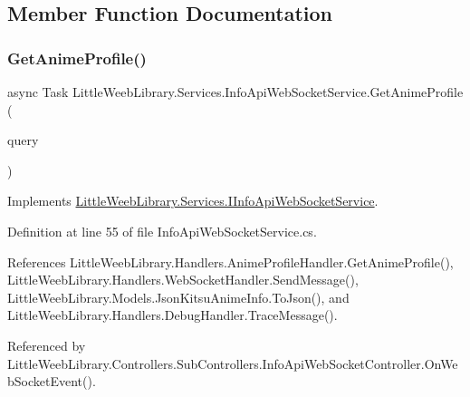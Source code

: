 \subsection{Member Function Documentation}
\mbox{\label{class_little_weeb_library_1_1_services_1_1_info_api_web_socket_service_a12f4d83332b28988ce0e2bc5ff3ed369}} 
\subsubsection{\texorpdfstring{Get\+Anime\+Profile()}{GetAnimeProfile()}}
{\footnotesize\ttfamily async Task Little\+Weeb\+Library.\+Services.\+Info\+Api\+Web\+Socket\+Service.\+Get\+Anime\+Profile (\begin{DoxyParamCaption}\item[{J\+Object}]{query }\end{DoxyParamCaption})}



Implements \mbox{\hyperlink{interface_little_weeb_library_1_1_services_1_1_i_info_api_web_socket_service_a6aef5d33af6000db81bd9467fd88220f}{Little\+Weeb\+Library.\+Services.\+I\+Info\+Api\+Web\+Socket\+Service}}.



Definition at line 55 of file Info\+Api\+Web\+Socket\+Service.\+cs.



References Little\+Weeb\+Library.\+Handlers.\+Anime\+Profile\+Handler.\+Get\+Anime\+Profile(), Little\+Weeb\+Library.\+Handlers.\+Web\+Socket\+Handler.\+Send\+Message(), Little\+Weeb\+Library.\+Models.\+Json\+Kitsu\+Anime\+Info.\+To\+Json(), and Little\+Weeb\+Library.\+Handlers.\+Debug\+Handler.\+Trace\+Message().



Referenced by Little\+Weeb\+Library.\+Controllers.\+Sub\+Controllers.\+Info\+Api\+Web\+Socket\+Controller.\+On\+Web\+Socket\+Event().


